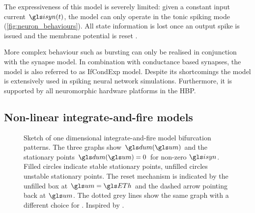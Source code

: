 The expressiveness of this model is severely limited: given a constant input current $\isyn(t)$, the model can only operate in the tonic spiking mode (\cref{fig:neuron_behaviours}). All state information is lost once an output spike is issued and the membrane potential is reset \cite{izhikevich2004model}.

More complex behaviour such as bursting can only be realised in conjunction with the synapse model. In combination with conductance based synapses, the \LIF model is also referred to as \acrshort{IfCondExp} model. Despite its shortcomings the model is extensively used in spiking neural network simulations. Furthermore, it is supported by all neuromorphic hardware platforms in the \acrfull{HBP}.

\subsection{Non-linear integrate-and-fire models}
\label{sec:nlif}

\begin{figure}
	\small
	\centering
	\caption[One dimensional integrate-and-fire model bifurcation patterns]{Sketch of one dimensional integrate-and-fire model bifurcation patterns. The three graphs show $\dum(\um)$ and the stationary points $\dum(\um) = 0$ for non-zero $\isyn$. Filled circles indicate stable stationary points, unfilled circles unstable stationary points. The reset mechanism is indicated by the unfilled box at $\um = \ETh$ and the dashed arrow pointing back at $\um$. The dotted grey lines show the same graph with a different choice for \isyn. Inspired by \cite{izhikevich2007dynamical}.}
	\label{fig:nlif_state}
\end{figure}


